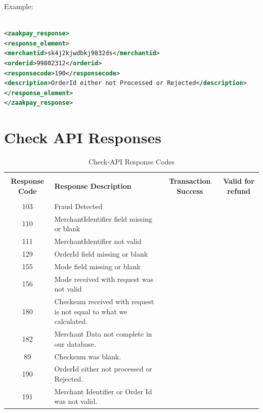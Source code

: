 \documentclass{article}
\newcommand{\xmark}{\ding{55}}
\begin{document}
Example:

\begin{lstlisting}[language=xml,breaklines=true]

<zaakpay_response>
<response_element>
<merchantid>sk4j2kjwdbkj9832ds</merchantid>
<orderid>99802312</orderid>
<responsecode>190</responsecode>
<description>OrderId either not Processed or Rejected</description>
</response_element>
</zaakpay_response>
\end{lstlisting}
\section{Check API Responses}

\begin{longtable}{||c|p{7.5cm}||c||c||}
  \rowcolor{white}
  \caption{Check-API Response Codes}\\
   \rowcolor{green!50}
\bfseries{Response Code} & \bfseries{Response Description} &\bfseries{Transaction Success} &\bfseries{Valid for refund} \\ \hline & & & \\
103 &Fraud Detected& \textcolor{red} {\xmark} & \textcolor{red} {\xmark}  \\
110 &MerchantIdentifier field missing or blank& \textcolor{red} {\xmark} & \textcolor{red} {\xmark}  \\
111 &MerchantIdentifier not valid& \textcolor{red} {\xmark} & \textcolor{red} {\xmark}  \\
129 &OrderId field missing or blank& \textcolor{red} {\xmark} & \textcolor{red} {\xmark}  \\
155 &Mode field missing or blank& \textcolor{red} {\xmark} & \textcolor{red} {\xmark}  \\
156 &Mode received with request was not valid& \textcolor{red} {\xmark} & \textcolor{red} {\xmark}  \\
180 &Checksum received with request is not equal to what we calculated.& \textcolor{red} {\xmark} & \textcolor{red} {\xmark}  \\
182 &Merchant Data not complete in our database.& \textcolor{red} {\xmark} & \textcolor{red} {\xmark}  \\
89 &Checksum was blank.& \textcolor{red} {\xmark} & \textcolor{red} {\xmark}  \\
190 &OrderId either not processed or Rejected.& \textcolor{red} {\xmark} & \textcolor{red} {\xmark}  \\
191 &Merchant Identifier or Order Id was not valid.& \textcolor{red} {\xmark} & \textcolor{red} {\xmark}  \\

\end{longtable}
\end{document}

